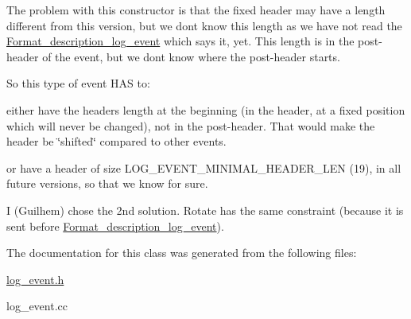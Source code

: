 The problem with this constructor is that the fixed header may have a length different from this version, but we don\textquotesingle{}t know this length as we have not read the \mbox{\hyperlink{classFormat__description__log__event}{Format\+\_\+description\+\_\+log\+\_\+event}} which says it, yet. This length is in the post-\/header of the event, but we don\textquotesingle{}t know where the post-\/header starts.

So this type of event H\+AS to\+:
\begin{DoxyItemize}
\item either have the header\textquotesingle{}s length at the beginning (in the header, at a fixed position which will never be changed), not in the post-\/header. That would make the header be \char`\"{}shifted\char`\"{} compared to other events.
\item or have a header of size L\+O\+G\+\_\+\+E\+V\+E\+N\+T\+\_\+\+M\+I\+N\+I\+M\+A\+L\+\_\+\+H\+E\+A\+D\+E\+R\+\_\+\+L\+EN (19), in all future versions, so that we know for sure.
\end{DoxyItemize}

I (Guilhem) chose the 2nd solution. Rotate has the same constraint (because it is sent before \mbox{\hyperlink{classFormat__description__log__event}{Format\+\_\+description\+\_\+log\+\_\+event}}). 

The documentation for this class was generated from the following files\+:\begin{DoxyCompactItemize}
\item 
\mbox{\hyperlink{log__event_8h}{log\+\_\+event.\+h}}\item 
log\+\_\+event.\+cc\end{DoxyCompactItemize}

